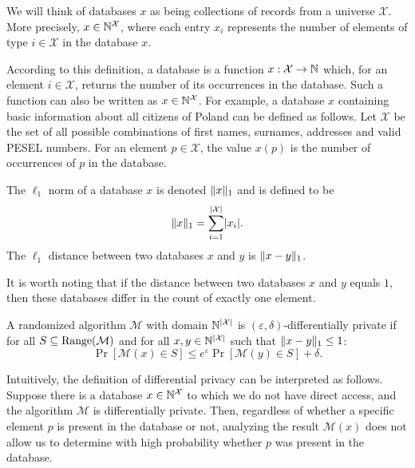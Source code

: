 \begin{definition}
We will think of databases $x$ as being collections of records from a universe $\mathcal{X}$. More precisely, $x \in \mathbb{N}^{\mathcal{X}}$, where each entry $x_i$ represents the number of elements of type $i \in \mathcal{X}$ in the database $x$.
\end{definition}

According to this definition, a database is a function $x : \mathcal{X} \rightarrow \mathbb{N}$ which, for an element $i \in \mathcal{X}$, returns the number of its occurrences in the database. Such a function can also be written as $x \in \mathbb{N}^{\mathcal{X}}$. For example, a database $x$ containing basic information about all citizens of Poland can be defined as follows. Let $\mathcal{X}$ be the set of all possible combinations of first names, surnames, addresses and valid PESEL numbers. For an element $p \in \mathcal{X}$, the value $x(p)$ is the number of occurrences of $p$ in the database.

\begin{definition}
The $\ell_1$ norm of a database $x$ is denoted $\lVert x\rVert_1$ and is defined to be
\[
\lVert x\rVert_1 = \sum_{i=1}^{\lvert\mathcal{X}\rvert} \lvert x_i\rvert.
\]
The $\ell_1$ distance between two databases $x$ and $y$ is $\lVert x - y\rVert_1$.
\end{definition}

It is worth noting that if the distance between two databases $x$ and $y$ equals $1$, then these databases differ in the count of exactly one element.

\begin{definition}
\label{def:app_diff_privacy}
A randomized algorithm $\mathcal{M}$ with domain $\mathbb{N}^{\lvert\mathcal{X}\rvert}$ is $(\varepsilon, \delta)$-differentially private if for all $S \subseteq \operatorname{Range}(\mathcal{M})$ and for all $x, y \in \mathbb{N}^{\lvert\mathcal{X}\rvert}$ such that $\lVert x - y\rVert_1 \leq 1$:
\[
\Pr[\mathcal{M}(x) \in S] \leq e^{\varepsilon} \Pr[\mathcal{M}(y) \in S] + \delta.
\]
\end{definition}

Intuitively, the definition of differential privacy can be interpreted as follows. Suppose there is a database $x \in \mathbb{N}^{\mathcal{X}}$ to which we do not have direct access, and the algorithm $\mathcal{M}$ is differentially private. Then, regardless of whether a specific element $p$ is present in the database or not, analyzing the result $\mathcal{M}(x)$ does not allow us to determine with high probability whether $p$ was present in the database.

